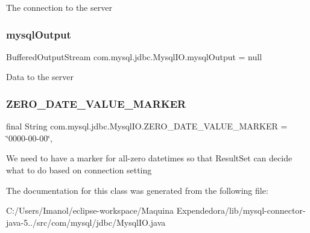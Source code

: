 The connection to the server \mbox{\label{classcom_1_1mysql_1_1jdbc_1_1_mysql_i_o_afddb7f18ab4d502a389d87ac9343e568}} 
\subsubsection{\texorpdfstring{mysql\+Output}{mysqlOutput}}
{\footnotesize\ttfamily Buffered\+Output\+Stream com.\+mysql.\+jdbc.\+Mysql\+I\+O.\+mysql\+Output = null\hspace{0.3cm}{\ttfamily [protected]}}

Data to the server \mbox{\label{classcom_1_1mysql_1_1jdbc_1_1_mysql_i_o_ab97d65895f0cd8157dd3f39c968eee68}} 
\subsubsection{\texorpdfstring{Z\+E\+R\+O\+\_\+\+D\+A\+T\+E\+\_\+\+V\+A\+L\+U\+E\+\_\+\+M\+A\+R\+K\+ER}{ZERO\_DATE\_VALUE\_MARKER}}
{\footnotesize\ttfamily final String com.\+mysql.\+jdbc.\+Mysql\+I\+O.\+Z\+E\+R\+O\+\_\+\+D\+A\+T\+E\+\_\+\+V\+A\+L\+U\+E\+\_\+\+M\+A\+R\+K\+ER = \char`\"{}0000-\/00-\/00\char`\"{}\hspace{0.3cm}{\ttfamily [static]}, {\ttfamily [protected]}}

We need to have a \textquotesingle{}marker\textquotesingle{} for all-\/zero datetimes so that Result\+Set can decide what to do based on connection setting 

The documentation for this class was generated from the following file\+:\begin{DoxyCompactItemize}
\item 
C\+:/\+Users/\+Imanol/eclipse-\/workspace/\+Maquina Expendedora/lib/mysql-\/connector-\/java-\/5../src/com/mysql/jdbc/Mysql\+I\+O.\+java\end{DoxyCompactItemize}
